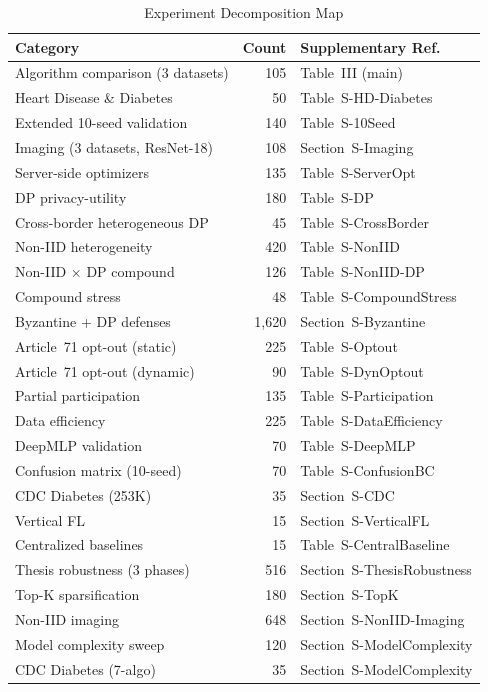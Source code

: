 \documentclass[conference]{IEEEtran}
\begin{document}
\begin{table}[htbp]
\centering
\caption{Experiment Decomposition Map}
\label{tab:experiment_map}
\small
\begin{tabular}{lrl}
\toprule
\textbf{Category} & \textbf{Count} & \textbf{Supplementary Ref.} \\
\midrule
Algorithm comparison (3 datasets) & 105 & Table~III (main) \\
Heart Disease \& Diabetes & 50 & Table~S-HD-Diabetes \\
Extended 10-seed validation & 140 & Table~S-10Seed \\
Imaging (3 datasets, ResNet-18) & 108 & Section~S-Imaging \\
Server-side optimizers & 135 & Table~S-ServerOpt \\
DP privacy-utility & 180 & Table~S-DP \\
Cross-border heterogeneous DP & 45 & Table~S-CrossBorder \\
Non-IID heterogeneity & 420 & Table~S-NonIID \\
Non-IID $\times$ DP compound & 126 & Table~S-NonIID-DP \\
Compound stress & 48 & Table~S-CompoundStress \\
Byzantine + DP defenses & 1,620 & Section~S-Byzantine \\
Article~71 opt-out (static) & 225 & Table~S-Optout \\
Article~71 opt-out (dynamic) & 90 & Table~S-DynOptout \\
Partial participation & 135 & Table~S-Participation \\
Data efficiency & 225 & Table~S-DataEfficiency \\
DeepMLP validation & 70 & Table~S-DeepMLP \\
Confusion matrix (10-seed) & 70 & Table~S-ConfusionBC \\
CDC Diabetes (253K) & 35 & Section~S-CDC \\
Vertical FL & 15 & Section~S-VerticalFL \\
Centralized baselines & 15 & Table~S-CentralBaseline \\
Thesis robustness (3 phases) & 516 & Section~S-ThesisRobustness \\
Top-K sparsification & 180 & Section~S-TopK \\
Non-IID imaging & 648 & Section~S-NonIID-Imaging \\
Model complexity sweep & 120 & Section~S-ModelComplexity \\
CDC Diabetes (7-algo) & 35 & Section~S-ModelComplexity \\

\end{tabular}
\end{table}
\end{document}
